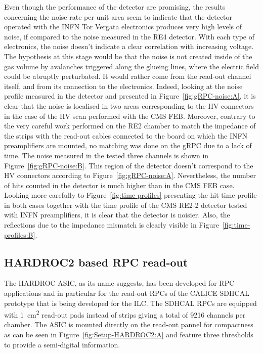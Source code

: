     Even though the performance of the detector are promising, the results concerning the noise rate per unit area seem to indicate that the detector operated with the INFN Tor Vergata electronics produces very high levels of noise, if compared to the noise measured in the RE4 detector. With each type of electronics, the noise doesn't indicate a clear correlation with increasing voltage. The hypothesis at this stage would be that the noise is not created inside of the gas volume by avalanches triggered along the glueing lines, where the electric field could be abruptly perturbated. It would rather come from the read-out channel itself, and from its connection to the electronics. Indeed, looking at the noise profile measured in the detector and presented in Figure~\ref{fig:gRPC-noise:A}, it is clear that the noise is localised in two areas corresponding to the HV connectors in the case of the HV scan performed with the CMS FEB. Moreover, contrary to the very careful work performed on the RE2 chamber to match the impedance of the strips with the read-out cables connected to the board on which the INFN preamplifiers are mounted, no matching was done on the gRPC due to a lack of time. The noise measured in the tested three channels is shown in Figure~\ref{fig:gRPC-noise:B}. This region of the detector doesn't correspond to the HV connectors according to Figure~\ref{fig:gRPC-noise:A}. Nevertheless, the number of hits counted in the detector is much higher than in the CMS FEB case. Looking more carefully to Figure~\ref{fig:time-profiles} presenting the hit time profile in both cases together with the time profile of the CMS RE2-2 detector tested with INFN preamplifiers, it is clear that the detector is noisier. Also, the reflections due to the impedance mismatch is clearly visible in Figure~\ref{fig:time-profiles:B}.

	\subsection{HARDROC2 based RPC read-out}
	\label{chapt6:ssec:HARDROC2}
	
	The \acf{HARDROC} ASIC, as its name suggests, has been developed for RPC applications and in particular for the read-out RPCs of the CALICE SDHCAL prototype that is being developed for the \acf{ILC}. The SDHCAL RPCs are equipped with \SI{1}{cm^2} read-out pads instead of strips giving a total of 9216 channels per chamber. The ASIC is mounted directly on the read-out pannel for compactness as can be seen in Figure~\ref{fig:Setup-HARDROC2:A} and feature three thresholds to provide a semi-digital information.
	 
